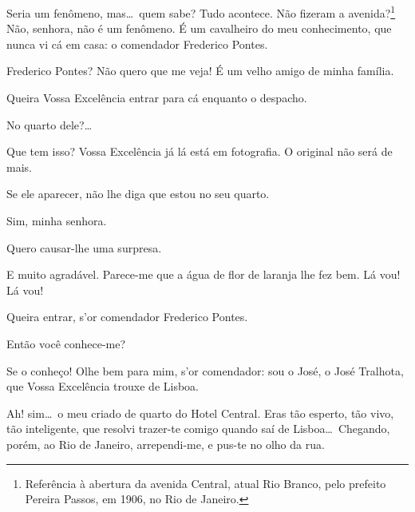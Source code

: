   Seria um fenômeno, mas\ldots\ quem sabe? Tudo acontece. Não
fizeram a avenida?\footnote{
Referência à abertura da avenida Central, atual Rio Branco, pelo prefeito Pereira Passos, em 1906, no Rio de Janeiro.} 
 Não,
senhora, não é um fenômeno.  É um cavalheiro do
meu conhecimento, que nunca vi cá em casa: o comendador Frederico
Pontes.

  Frederico Pontes? Não quero que me veja! É um velho
amigo de minha família.

 
Queira Vossa Excelência entrar para cá enquanto o despacho.

  No quarto
dele?\ldots

  Que tem isso? Vossa Excelência já lá
está em fotografia. O original não será de mais.

  Se ele aparecer, não lhe diga
que estou no seu quarto.

  Sim, minha senhora.

  Quero causar{}-lhe uma surpresa.

  E muito agradável.  Parece{}-me que a água de
flor de laranja lhe fez bem.  Lá
vou! Lá vou! 


   Queira entrar,
s'or comendador Frederico Pontes. 

  Então você conhece{}-me?

  Se o conheço! Olhe bem para mim, s'or
comendador: sou o José, o José Tralhota, que Vossa Excelência trouxe de
Lisboa.

   Ah!
sim\ldots\ o meu criado de quarto do Hotel Central. Eras tão esperto, tão
vivo, tão inteligente, que resolvi trazer{}-te comigo quando saí de
Lisboa\ldots\ Chegando, porém, ao Rio de Janeiro, arrependi{}-me, e pus{}-te no
olho da rua. 

